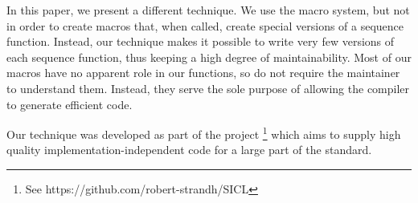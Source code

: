 In this paper, we present a different technique.  We use the
\commonlisp{} macro system, but not in order to create macros that,
when called, create special versions of a sequence function.  Instead,
our technique makes it possible to write very few versions of each
sequence function, thus keeping a high degree of maintainability.
Most of our macros have no apparent role in our functions, so do not
require the maintainer to understand them.  Instead, they serve the
sole purpose of allowing the compiler to generate efficient code.

Our technique was developed as part of the \sicl{} project%
\footnote{See https://github.com/robert-strandh/SICL} which aims to
supply high quality implementation-independent code for a large part
of the \commonlisp{} standard.
